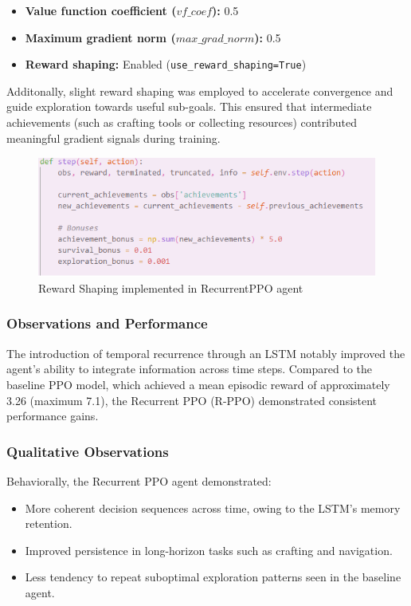 \documentclass[twocolumn]{article}
\begin{document}
\begin{itemize}
    \item \textbf{Value function coefficient ($vf\_coef$):} 0.5
    \item \textbf{Maximum gradient norm ($max\_grad\_norm$):} 0.5
    \item \textbf{Reward shaping:} Enabled (\texttt{use\_reward\_shaping=True})
\end{itemize}


Additonally, slight reward shaping was employed to accelerate convergence and guide exploration towards useful sub-goals. This ensured that intermediate achievements (such as crafting tools or collecting resources) contributed meaningful gradient signals during training.
\begin{figure}[H]
    \centering
    \includegraphics[width=0.5\linewidth]{images/RewardShaping.png}
    \caption{Reward Shaping implemented in RecurrentPPO agent}
\end{figure}

\subsubsection*{Observations and Performance}
The introduction of temporal recurrence through an LSTM notably improved the agent's ability to integrate information across time steps. Compared to the baseline PPO model, which achieved a mean episodic reward of approximately 3.26 (maximum 7.1), the Recurrent PPO (R-PPO) demonstrated consistent performance gains.

\subsubsection*{Qualitative Observations}

Behaviorally, the Recurrent PPO agent demonstrated:
\begin{itemize}
    \item More coherent decision sequences across time, owing to the LSTM's memory retention.
    \item Improved persistence in long-horizon tasks such as crafting and navigation.
    \item Less tendency to repeat suboptimal exploration patterns seen in the baseline agent.
\end{itemize}
\end{document}

